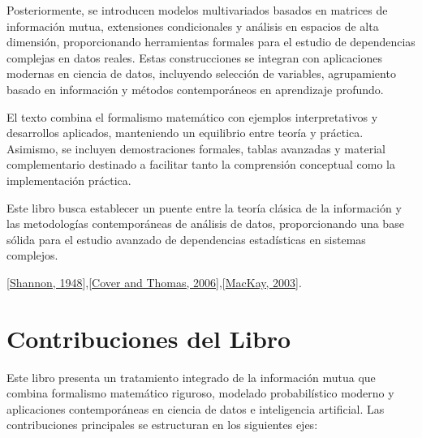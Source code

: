 \documentclass[letterpaper,10pt,english]{jupyterBook}
\begin{document}
\sphinxAtStartPar
Posteriormente, se introducen modelos multivariados basados en matrices de información mutua, extensiones condicionales y análisis en espacios de alta dimensión, proporcionando herramientas formales para el estudio de dependencias complejas en datos reales. Estas construcciones se integran con aplicaciones modernas en ciencia de datos, incluyendo selección de variables, agrupamiento basado en información y métodos contemporáneos en aprendizaje profundo.

\sphinxAtStartPar
El texto combina el formalismo matemático con ejemplos interpretativos y desarrollos aplicados, manteniendo un equilibrio entre teoría y práctica. Asimismo, se incluyen demostraciones formales, tablas avanzadas y material complementario destinado a facilitar tanto la comprensión conceptual como la implementación práctica.

\sphinxAtStartPar
Este libro busca establecer un puente entre la teoría clásica de la información y las metodologías contemporáneas de análisis de datos, proporcionando una base sólida para el estudio avanzado de dependencias estadísticas en sistemas complejos.

\sphinxAtStartPar
{[}\hyperlink{cite.05_appendices/references:id6}{Shannon, 1948}{]},{[}\hyperlink{cite.05_appendices/references:id2}{Cover and Thomas, 2006}{]},{[}\hyperlink{cite.05_appendices/references:id3}{MacKay, 2003}{]}.

\sphinxstepscope


\chapter{Contribuciones del Libro}
\label{\detokenize{00_frontmatter/contributions:contribuciones-del-libro}}\label{\detokenize{00_frontmatter/contributions::doc}}
\sphinxAtStartPar
Este libro presenta un tratamiento integrado de la información mutua que combina formalismo matemático riguroso, modelado probabilístico moderno y aplicaciones contemporáneas en ciencia de datos e inteligencia artificial. Las contribuciones principales se estructuran en los siguientes ejes:
\end{document}
